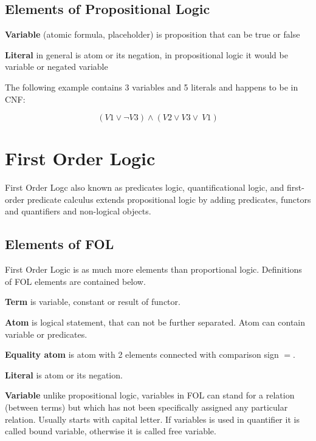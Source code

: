 \subsection{Elements of Propositional Logic}

\textbf{Variable} (atomic formula, placeholder) is proposition that can be true or false

\textbf{Literal} in general is atom or its negation, in propositional logic it would be variable or negated variable

The following example contains 3 variables and 5 literals and happens to be in \gls{CNF}:

\begin{equation} \label{eg:PL_1}
  (V1 \lor \neg V3) \land (V2 \lor  V3 \lor ~V1)
\end{equation}

\section{First Order Logic}

First Order Logc also known as predicates logic, quantificational logic, and first-order predicate calculus extends propositional logic by adding predicates, functors and quantifiers and non-logical objects.

\subsection{Elements of FOL}

First Order Logic is as much more elements than proportional logic. Definitions of FOL elements are contained below.

\textbf{Term}
is variable, constant or result of functor.

\textbf{Atom}
is logical statement, that can not be further separated. Atom can contain variable or predicates.

\textbf{Equality atom}
is atom with 2 elements connected with comparison sign $=$.

\textbf{Literal}
is atom or its negation.

\textbf{Variable}
unlike propositional logic, variables in \gls{FOL} can stand for a relation (between terms) but which has not been specifically assigned any particular relation.
Usually starts with capital letter. If variables is used in quantifier it is called bound variable, otherwise it is called free variable.

